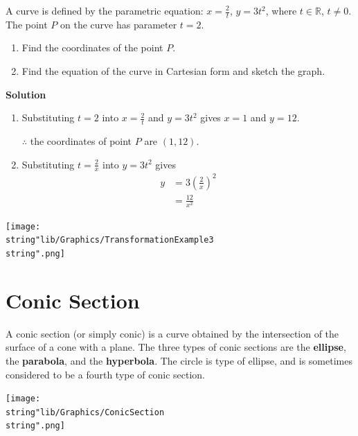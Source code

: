 \documentclass[11pt,a4paper]{book}
\newcommand{\R}{\mathbb{R}}
\begin{document}
\newpage

\begin{example}{}

A curve is defined by the parametric equation: ${\displaystyle x=\frac{2}{t}}$, $y=3t^{2}$, where $t\in\R$, $t\neq0$. The point $P$ on the curve
has parameter $t=2$.

\begin{enumerate}[label=(\alph*)]

\item Find the coordinates of the point $P$.

\item Find the equation of the curve in Cartesian form and sketch
the graph.

\end{enumerate}

\textbf{Solution}

\begin{enumerate}[label=(\alph*)]

\item  Substituting $t=2$ into ${\displaystyle x=\frac{2}{t}}$
and $y=3t^{2}$ gives $x=1$ and $y=12$.

$\therefore$ the coordinates of point $P$ are $\left(1,12\right)$.

\item  Substituting ${\displaystyle t=\frac{2}{x}}$ into $y=3t^{2}$
gives
\begin{align*}
y & =3\left(\frac{2}{x}\right)^{2}\\
 & =\frac{12}{x^{2}}
\end{align*}

\end{enumerate}
\begin{center}
\texttt{[image: \\string"lib/Graphics/TransformationExample3\\string".png]}
\par\end{center}
\end{example}

\newpage

\section{Conic Section}

A conic section (or simply conic) is a curve obtained by the intersection
of the surface of a cone with a plane. The three types of conic sections
are the \textbf{ellipse}, the \textbf{parabola}, and the \textbf{hyperbola}.
The circle is type of ellipse, and is sometimes considered to be a
fourth type of conic section.
\begin{center}
\texttt{[image: \\string"lib/Graphics/ConicSection\\string".png]}
\par\end{center}
\end{document}
